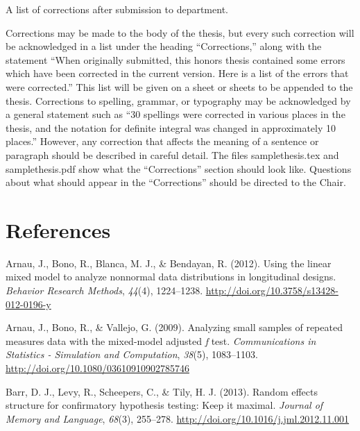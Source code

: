 \documentclass[12pt, twoside]{amherstthesis}
\begin{document}
A list of corrections after submission to department.

Corrections may be made to the body of the thesis, but every such correction will be acknowledged in a list under the heading ``Corrections,'' along with the statement ``When originally submitted, this honors thesis contained some errors which have been corrected in the current version. Here is a list of the errors that were corrected.'' This list will be given on a sheet or sheets to be appended to the thesis. Corrections to spelling, grammar, or typography may be acknowledged by a general statement such as ``30 spellings were corrected in various places in the thesis, and the notation for definite integral was changed in approximately 10 places.'' However, any correction that affects the meaning of a sentence or paragraph should be described in careful detail. The files samplethesis.tex and samplethesis.pdf show what the ``Corrections'' section should look like. Questions about what should appear in the ``Corrections'' should be directed to the Chair.

\backmatter

\hypertarget{references}{%
\chapter*{References}\label{references}}

\noindent

\setlength{\parindent}{-0.20in}
\setlength{\leftskip}{0.20in}
\setlength{\parskip}{8pt}

\hypertarget{refs}{}
\leavevmode\hypertarget{ref-arnau_using_2012}{}%
Arnau, J., Bono, R., Blanca, M. J., \& Bendayan, R. (2012). Using the linear mixed model to analyze nonnormal data distributions in longitudinal designs. \emph{Behavior Research Methods}, \emph{44}(4), 1224--1238. \url{http://doi.org/10.3758/s13428-012-0196-y}

\leavevmode\hypertarget{ref-arnau_analyzing_2009}{}%
Arnau, J., Bono, R., \& Vallejo, G. (2009). Analyzing small samples of repeated measures data with the mixed-model adjusted \emph{f} test. \emph{Communications in Statistics - Simulation and Computation}, \emph{38}(5), 1083--1103. \url{http://doi.org/10.1080/03610910902785746}

\leavevmode\hypertarget{ref-barr_random_2013}{}%
Barr, D. J., Levy, R., Scheepers, C., \& Tily, H. J. (2013). Random effects structure for confirmatory hypothesis testing: Keep it maximal. \emph{Journal of Memory and Language}, \emph{68}(3), 255--278. \url{http://doi.org/10.1016/j.jml.2012.11.001}
\end{document}
